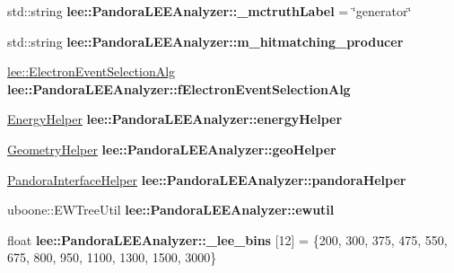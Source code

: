 \begin{DoxyCompactItemize}
\item 
\hypertarget{group__lee_ga462f214c8a7ede15d53754c120f54d45}{std\-::string {\bfseries lee\-::\-Pandora\-L\-E\-E\-Analyzer\-::\-\_\-mctruth\-Label} = \char`\"{}generator\char`\"{}}\label{group__lee_ga462f214c8a7ede15d53754c120f54d45}

\item 
\hypertarget{group__lee_gafeca3ce0e272568cc6a1dbec12e87736}{std\-::string {\bfseries lee\-::\-Pandora\-L\-E\-E\-Analyzer\-::m\-\_\-hitmatching\-\_\-producer}}\label{group__lee_gafeca3ce0e272568cc6a1dbec12e87736}

\item 
\hypertarget{group__lee_gabc3e2092fa2fa08dce6f6eb6778519ce}{\hyperlink{classlee_1_1ElectronEventSelectionAlg}{lee\-::\-Electron\-Event\-Selection\-Alg} {\bfseries lee\-::\-Pandora\-L\-E\-E\-Analyzer\-::f\-Electron\-Event\-Selection\-Alg}}\label{group__lee_gabc3e2092fa2fa08dce6f6eb6778519ce}

\item 
\hypertarget{group__lee_ga15efa0b525385a8f0ac4547690d44194}{\hyperlink{classEnergyHelper}{Energy\-Helper} {\bfseries lee\-::\-Pandora\-L\-E\-E\-Analyzer\-::energy\-Helper}}\label{group__lee_ga15efa0b525385a8f0ac4547690d44194}

\item 
\hypertarget{group__lee_gaa53a7fef751a9f2aa891b067875eb19b}{\hyperlink{classGeometryHelper}{Geometry\-Helper} {\bfseries lee\-::\-Pandora\-L\-E\-E\-Analyzer\-::geo\-Helper}}\label{group__lee_gaa53a7fef751a9f2aa891b067875eb19b}

\item 
\hypertarget{group__lee_ga00fc07207cfb81cd3cbbe5a8785d3c23}{\hyperlink{classPandoraInterfaceHelper}{Pandora\-Interface\-Helper} {\bfseries lee\-::\-Pandora\-L\-E\-E\-Analyzer\-::pandora\-Helper}}\label{group__lee_ga00fc07207cfb81cd3cbbe5a8785d3c23}

\item 
\hypertarget{group__lee_gaf8493a6adc146f58425a9808bde7de2f}{uboone\-::\-E\-W\-Tree\-Util {\bfseries lee\-::\-Pandora\-L\-E\-E\-Analyzer\-::ewutil}}\label{group__lee_gaf8493a6adc146f58425a9808bde7de2f}

\item 
\hypertarget{group__lee_ga228a9ca7bca5fedf7187f5db8358fd00}{float {\bfseries lee\-::\-Pandora\-L\-E\-E\-Analyzer\-::\-\_\-lee\-\_\-bins} \mbox{[}12\mbox{]} = \{200, 300, 375, 475, 550, 675, 800, 950, 1100, 1300, 1500, 3000\}}\label{group__lee_ga228a9ca7bca5fedf7187f5db8358fd00}


\end{DoxyCompactItemize}
